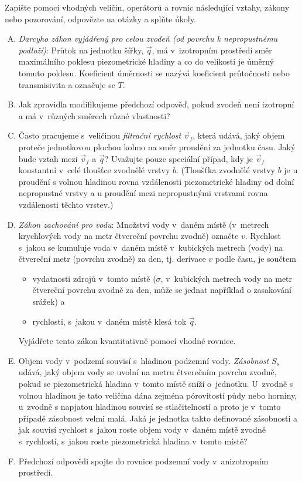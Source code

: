 Zapište pomocí vhodných veličin, operátorů a rovnic následující vztahy, zákony nebo pozorování,
odpovězte na otázky a splňte úkoly.
\begin{enumerate}[A)]
\item \textit{Darcyho zákon vyjádřený pro celou zvodeň (od povrchu k nepropustnému podloží)}:
  Průtok na jednotku šířky, $\vec q$, má v izotropním prostředí směr
  maximálního poklesu piezometrické hladiny a co do velikosti je
  úměrný tomuto poklesu. Koeficient úměrnosti se nazývá koeficient
  průtočnosti nebo transmisivita a označuje se $T$.
\item Jak zpravidla modifikujeme předchozí odpověď, pokud zvodeň není
  izotropní a má v různých směrech různé vlastnosti?
\item Často pracujeme s veličinou \textit{filtrační rychlost} $\vec v_f$, která
  udává, jaký objem proteče jednotkovou plochou kolmo na směr proudění
  za jednotku času. Jaký bude vztah mezi $\vec v_f$ a $\vec q$? Uvažujte pouze
  speciální případ, kdy je $\vec v_f$ konstantní v celé tloušťce zvodnělé
  vrstvy $b$. (Tloušťka zvodnělé vrstvy $b$ je u proudění s volnou hladinou rovna vzdálenosti piezometrické hladiny od dolní nepropustné vrstvy a u proudění mezi nepropustnými vrstvami rovna vzdálenosti těchto vrstev.) 
  \stranka
\item \textit{Zákon zachování pro vodu}: Množství vody v daném místě (v metrech krychlových vody na metr čtvereční povrchu zvodně) označte $v$. Rychlost s jakou se kumuluje voda v daném místě v kubických
  metrech (vody) na čtvereční metr (povrchu zvodně) za den, tj. derivace $v$ podle času, je
  součtem
  \begin{itemize} pt
  \item vydatnosti zdrojů v tomto místě ($\sigma$, v kubických
    metrech vody na metr čtvereční povrchu zvodně za den, může se jednat například o zasakování srážek) a
  \item rychlosti, s jakou v daném místě klesá tok $\vec q$.
\end{itemize}
  Vyjádřete tento zákon kvantitativně pomocí vhodné rovnice.
\item Objem vody v podzemí souvisí s hladinou podzemní
  vody. \textit{Zásobnost} $S_s$ udává, jaký objem vody se uvolní na
  metru čtverečním povrchu zvodně, pokud se piezometrická hladina
  v tomto místě sníží o jednotku. U zvodně s volnou hladinou je tato
  veličina dána zejména pórovitostí půdy nebo horniny, u zvodně s
  napjatou hladinou souvisí se stlačitelností a proto je v tomto
  případě zásobnost velmi malá. Jaká je jednotka takto definované
  zásobnosti a jak souvisí rychlost s jakou roste objem vody v daném
  místě zvodně s rychlostí, s jakou roste piezometrická hladina
  v tomto místě?
\item Předchozí odpovědi spojte do rovnice 
  podzemní vody v anizotropním prostředí.
\end{enumerate}

